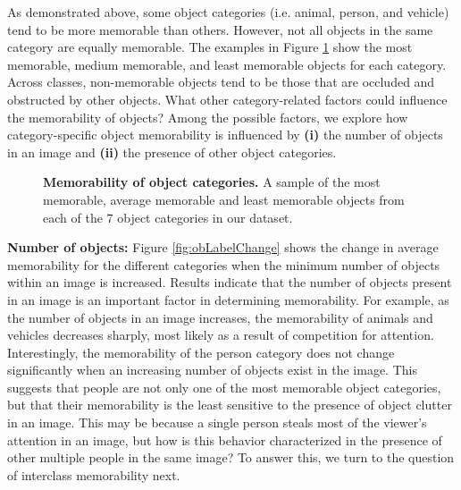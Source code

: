 As demonstrated above, some object categories (i.e. animal, person, and vehicle) tend to be more memorable than others. However, not all objects in the same category are equally memorable. The examples in Figure \ref{fig:obLabelQual} show the most memorable, medium memorable, and least memorable objects for each category. Across classes, non-memorable objects tend to be those that are occluded and obstructed by other objects. What other category-related factors could influence the memorability of objects? Among the possible factors, we explore how category-specific object memorability is influenced by \textbf{(i)} the number of objects in an image and \textbf{(ii)} the presence of other object categories. 

\begin{figure}[!htb]
\centering
{}
\vspace{-5mm}\caption{\footnotesize\textbf{Memorability of object categories.} A sample of the most memorable, average memorable and least memorable objects from each of the $7$ object categories in our dataset.}\label{fig:obLabelQual}
\end{figure}

\noindent\textbf{Number of objects:} %
Figure \ref{fig:obLabelChange} shows the change in average memorability for the different categories when the minimum number of objects within an image is increased. Results indicate that the number of objects present in an image is an important factor in determining memorability. For example, as the number of objects in an image increases, the memorability of animals and vehicles decreases sharply, most likely as a result of competition for attention. Interestingly, the memorability of the person category does not change significantly when an increasing number of objects exist in the image. This suggests that people are not only one of the most memorable object categories, but that their memorability is the least sensitive to the presence of object clutter in an image. This may be because a single person steals most of the viewer's attention in an image, but how is this behavior characterized in the presence of other multiple people in the same image? To answer this, we turn to the question of interclass memorability next.

